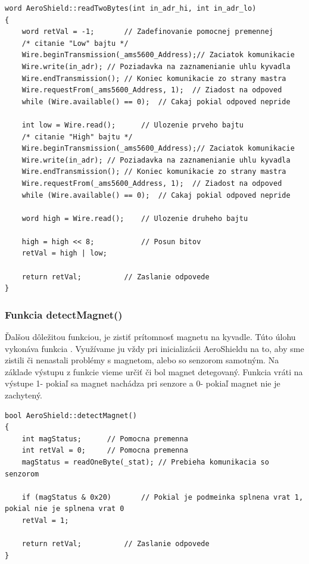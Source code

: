 \begin{lstlisting}[caption={Zdrojový kód funkcie readTwoBytes.},captionpos=b]
word AeroShield::readTwoBytes(int in_adr_hi, int in_adr_lo)        
{
	word retVal = -1;		// Zadefinovanie pomocnej premennej
	/* citanie "Low" bajtu */
	Wire.beginTransmission(_ams5600_Address);// Zaciatok komunikacie 
	Wire.write(in_adr);	// Poziadavka na zaznamenianie uhlu kyvadla 
	Wire.endTransmission();	// Koniec komunikacie zo strany mastra
	Wire.requestFrom(_ams5600_Address, 1);	// Ziadost na odpoved  
	while (Wire.available() == 0);	// Cakaj pokial odpoved nepride  

	int low = Wire.read();     	// Ulozenie prveho bajtu 
	/* citanie "High" bajtu */
	Wire.beginTransmission(_ams5600_Address);// Zaciatok komunikacie 
	Wire.write(in_adr);	// Poziadavka na zaznamenianie uhlu kyvadla 
	Wire.endTransmission();	// Koniec komunikacie zo strany mastra
	Wire.requestFrom(_ams5600_Address, 1);	// Ziadost na odpoved  
	while (Wire.available() == 0);	// Cakaj pokial odpoved nepride  
	
	word high = Wire.read();   	// Ulozenie druheho bajtu 
	
	high = high << 8;          	// Posun bitov
	retVal = high | low;
	
	return retVal;	   	  	// Zaslanie odpovede 
}
\end{lstlisting}

\subsubsection{Funkcia detectMagnet()}

Ďalšou dôležitou funkciou, je zistiť prítomnosť magnetu na kyvadle. Túto úlohu vykonáva funkcia . Využívame ju vždy pri inicializácii AeroShieldu na to, aby sme zistili či nenastali problémy s magnetom, alebo so senzorom samotným. Na základe výstupu z funkcie vieme určiť či bol magnet detegovaný. Funkcia vráti na výstupe 1- pokiaľ sa magnet nachádza pri senzore a 0- pokiaľ magnet nie je zachytený. 

\begin{lstlisting}[caption={Zdrojový kód funkcie detectMagnet.},captionpos=b]
bool AeroShield::detectMagnet() 
{
	int magStatus;		// Pomocna premenna  
	int retVal = 0;		// Pomocna premenna
	magStatus = readOneByte(_stat);	// Prebieha komunikacia so senzorom                        
	
	if (magStatus & 0x20)		// Pokial je podmeinka splnena vrat 1, pokial nie je splnena vrat 0 
	retVal = 1;
	
	return retVal;			// Zaslanie odpovede 
}
\end{lstlisting}

